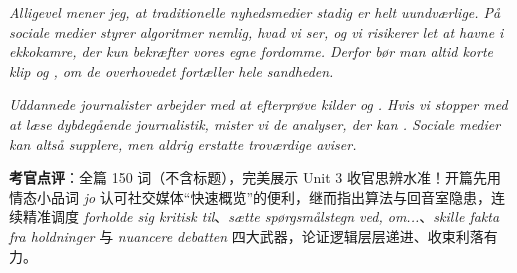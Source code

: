 \begin{answerbox}
\textit{Alligevel mener jeg, at traditionelle nyhedsmedier stadig er helt uundværlige. På sociale medier styrer algoritmer nemlig, hvad vi ser, og vi risikerer let at havne i ekkokamre, der kun bekræfter vores egne fordomme. Derfor bør man altid  korte klip og , om de overhovedet fortæller hele sandheden.}

\textit{Uddannede journalister arbejder med at efterprøve kilder og . Hvis vi stopper med at læse dybdegående journalistik, mister vi de analyser, der kan . Sociale medier kan altså supplere, men aldrig erstatte troværdige aviser.}

\small\textbf{考官点评}：全篇 150 词（不含标题），完美展示 Unit 3 收官思辨水准！开篇先用情态小品词 \textit{jo} 认可社交媒体“快速概览”的便利，继而指出算法与回音室隐患，连续精准调度 \textit{forholde sig kritisk til}、\textit{sætte spørgsmålstegn ved, om...}、\textit{skille fakta fra holdninger} 与 \textit{nuancere debatten} 四大武器，论证逻辑层层递进、收束利落有力。
\end{answerbox}
